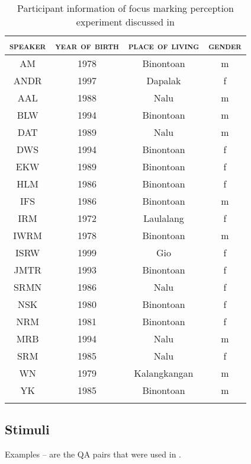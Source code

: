 \begin{table}
\caption{Participant information of focus marking perception experiment discussed in  }
\label{speakers-foucs}
	
	\begin{tabular}{cccc}
		 \lsptoprule
			\textsc{speaker}   & 	\textsc{year of birth}       & 	\textsc{place of living} & 	\textsc{gender} \\
		 \midrule
		AM   & 1978 & Binontoan    & m \\
ANDR & 1997 & Dapalak      & f \\
AAL  & 1988 & Nalu         & m \\
BLW  & 1994 & Binontoan    & m \\
DAT  & 1989 & Nalu         & m \\
DWS  & 1994 & Binontoan    & f \\
EKW  & 1989 & Binontoan    & f \\
HLM  & 1986 & Binontoan    & f \\
IFS  & 1986 & Binontoan    & m \\
IRM  & 1972 & Laulalang    & f \\
IWRM & 1978 & Binontoan    & m \\
ISRW & 1999 & Gio          & f \\
JMTR & 1993 & Binontoan    & f \\
SRMN & 1986 & Nalu         & f \\
NSK  & 1980 & Binontoan    & f \\
NRM  & 1981 & Binontoan    & f \\
MRB  & 1994 & Nalu         & m \\
SRM  & 1985 & Nalu         & f \\
WN   & 1979 & Kalangkangan & m \\
YK   & 1985 & Binontoan    & m \\
		 \lspbottomrule
	\end{tabular}
\end{table}






\subsection{Stimuli}
\label{Prosodyic Prominence Stimuli}

Examples -- are the QA pairs that were used in  . 

